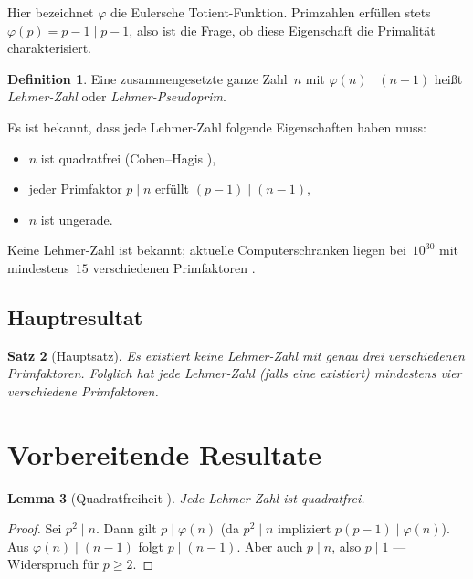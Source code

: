 \documentclass[12pt,a4paper]{amsart}
\newtheorem{theorem}{Satz}[section]
\newtheorem{lemma}[theorem]{Lemma}
\theoremstyle{definition}
\newtheorem{definition}[theorem]{Definition}
\newcommand{\euler}{\varphi}
\begin{document}
Hier bezeichnet $\euler$ die Eulersche Totient-Funktion. Primzahlen erfüllen
stets $\euler(p) = p - 1 \mid p - 1$, also ist die Frage, ob diese Eigenschaft
die Primalität charakterisiert.

\begin{definition}
Eine zusammengesetzte ganze Zahl~$n$ mit $\euler(n) \mid (n-1)$ heißt
\emph{Lehmer-Zahl} oder \emph{Lehmer-Pseudoprim}.
\end{definition}

Es ist bekannt, dass jede Lehmer-Zahl folgende Eigenschaften haben muss:
\begin{itemize}
  \item $n$ ist quadratfrei (Cohen--Hagis \cite{Cohen1980}),
  \item jeder Primfaktor $p \mid n$ erfüllt $(p-1) \mid (n-1)$,
  \item $n$ ist ungerade.
\end{itemize}

Keine Lehmer-Zahl ist bekannt; aktuelle Computerschranken liegen bei~$10^{30}$
mit mindestens~$15$ verschiedenen Primfaktoren \cite{Banks2009}.

\subsection{Hauptresultat}

\begin{theorem}[Hauptsatz]
\label{thm:haupt}
Es existiert keine Lehmer-Zahl mit genau drei verschiedenen Primfaktoren.
Folglich hat jede Lehmer-Zahl (falls eine existiert) mindestens vier
verschiedene Primfaktoren.
\end{theorem}

\section{Vorbereitende Resultate}

\begin{lemma}[Quadratfreiheit {\cite{Cohen1980}}]
\label{lem:qfrei}
Jede Lehmer-Zahl ist quadratfrei.
\end{lemma}

\begin{proof}
Sei $p^2 \mid n$. Dann gilt $p \mid \euler(n)$ (da $p^2 \mid n$ impliziert
$p(p-1) \mid \euler(n)$). Aus $\euler(n) \mid (n-1)$ folgt $p \mid (n-1)$.
Aber auch $p \mid n$, also $p \mid 1$ — Widerspruch für $p \ge 2$.
\end{proof}
\end{document}
